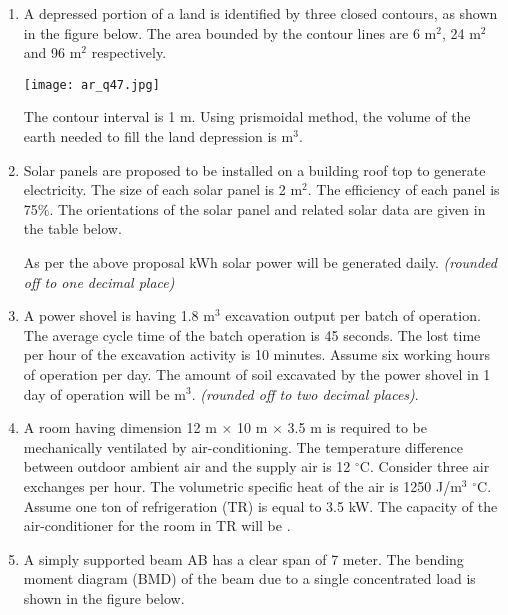 \documentclass[12pt]{article}
\begin{document}
\begin{enumerate}[label=Q.\arabic*,start=26]
	\item A depressed portion of a land is identified by three closed contours, as shown in the figure below. The area bounded by the contour lines are 6 m$^2$, 24 m$^2$ and 96 m$^2$ respectively.\\
		\begin{center}{
				\texttt{[image: ar\_q47.jpg]}
		}\end{center}
		The contour interval is 1 m. Using prismoidal method, the volume of the earth needed to fill the land depression is \underline{\hspace{2cm}} m$^3$.

	\item Solar panels are proposed to be installed on a building roof top to generate electricity. The size of each solar panel is 2 m$^2$. The efficiency of each panel is 75\%. The orientations of the solar panel and related solar data are given in the table below.\hfill


		As per the above proposal \underline{\hspace{2cm}} kWh solar power will be generated daily. \textit{(rounded off to one decimal place)}

	\item A power shovel is having 1.8 m$^3$ excavation output per batch of operation. The average cycle time of the batch operation is 45 seconds. The lost time per hour of the excavation activity is 10 minutes. Assume six working hours of operation per day. The amount of soil excavated by the power shovel in 1 day of operation will be \underline{\hspace{2cm}} m$^3$. \textit{(rounded off to two decimal places)}.


	\item A room having dimension 12 m $\times$ 10 m $\times$ 3.5 m is required to be mechanically ventilated by air-conditioning. The temperature difference between outdoor ambient air and the supply air is 12 $^\circ$C. Consider three air exchanges per hour. The volumetric specific heat of the air is 1250 J/m$^3$ $^\circ$C. Assume one ton of refrigeration (TR) is equal to 3.5 kW. The capacity of the air-conditioner for the room in TR will be \underline{\hspace{2cm}}.

	\item A simply supported beam AB has a clear span of 7 meter. The bending moment diagram (BMD) of the beam due to a single concentrated load is shown in the figure below.


\end{enumerate}
\end{document}
